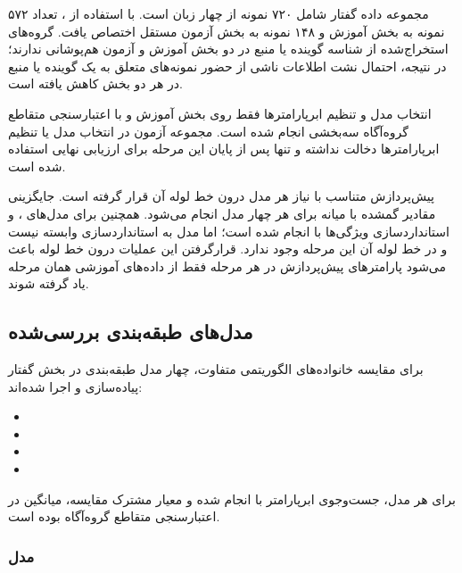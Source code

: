 \documentclass[12pt,a4paper,oneside]{report}
\begin{document}
مجموعه داده گفتار شامل ۷۲۰ نمونه از چهار زبان است. با استفاده از
، تعداد ۵۷۲ نمونه به بخش آموزش و ۱۴۸ نمونه به
بخش آزمون مستقل اختصاص یافت. گروه‌های استخراج‌شده از شناسه گوینده یا منبع
در دو بخش آموزش و آزمون هم‌پوشانی ندارند؛ در نتیجه، احتمال نشت اطلاعات ناشی
از حضور نمونه‌های متعلق به یک گوینده یا منبع در هر دو بخش کاهش یافته است.

انتخاب مدل و تنظیم ابرپارامترها فقط روی بخش آموزش و با اعتبارسنجی متقاطع
گروه‌آگاه سه‌بخشی انجام شده است. مجموعه آزمون در انتخاب مدل یا تنظیم
ابرپارامترها دخالت نداشته و تنها پس از پایان این مرحله برای ارزیابی نهایی
استفاده شده است.

پیش‌پردازش متناسب با نیاز هر مدل درون خط لوله آن قرار گرفته است. جایگزینی
مقادیر گمشده با میانه برای هر چهار مدل انجام می‌شود. همچنین برای مدل‌های
،  و  استانداردسازی ویژگی‌ها با
 انجام شده است؛ اما مدل  به
استانداردسازی وابسته نیست و در خط لوله آن این مرحله وجود ندارد. قرارگرفتن
این عملیات درون خط لوله باعث می‌شود پارامترهای پیش‌پردازش در هر مرحله فقط
از داده‌های آموزشی همان مرحله یاد گرفته شوند.


\subsection{مدل‌های طبقه‌بندی بررسی‌شده}

برای مقایسه خانواده‌های الگوریتمی متفاوت، چهار مدل طبقه‌بندی در بخش گفتار
پیاده‌سازی و اجرا شده‌اند:

\begin{itemize}

\item
{}

\item
{}

\item
{}

\item
{}

\end{itemize}

برای هر مدل، جست‌وجوی ابرپارامتر با  انجام شده و معیار
مشترک مقایسه، میانگین  در اعتبارسنجی متقاطع گروه‌آگاه بوده
است.


\subsubsection{مدل }
\end{document}
